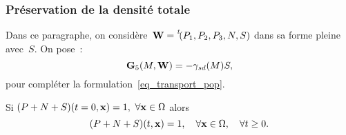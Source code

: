 \documentclass[main.tex]{subfiles}
\begin{document}
\subsubsection{Préservation de la densité totale}
Dans ce paragraphe, on considère~${\bf W}=\prescript{\mathit{t\!}}{}{(P_1, P_2, P_3, N, S)}$ dans sa forme pleine \ie avec~$S$. On pose~:
\begin{equation}\label{eq:G5}
{\bf G}_5(M,{\bf W}) = -\gamma_{sd}(M) S,
\end{equation}
pour compléter la formulation~\eqref{eq_transport_pop}.
\begin{prop}
Si $(P+N+S)(t=0,\mathbf{x})=1,\ \forall \mathbf{x} \in \Omega$ alors 
\begin{equation}
(P+N+S)(t,\mathbf{x})=1,\quad \forall \mathbf{x} \in \Omega, \quad \forall t\geq 0.
\end{equation}
\end{prop}
\end{document}

